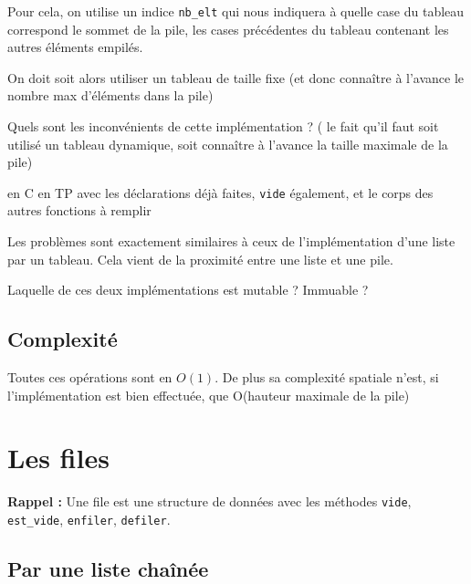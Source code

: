\begin{idee}
	Pour cela, on utilise un indice \texttt{nb\_elt} qui nous indiquera à quelle case du tableau correspond le sommet de la pile, les cases précédentes du tableau contenant les autres éléments empilés.
\end{idee}


\begin{impl}
	On doit soit alors utiliser un tableau de taille fixe (et donc connaître à l'avance le nombre max d'éléments dans la pile)
\end{impl}


\begin{exercise}
	Quels sont les inconvénients de cette implémentation ? ( le fait qu'il faut soit utilisé un tableau dynamique, soit connaître à l'avance la taille maximale de la pile)
\end{exercise}

\begin{impl}
	en C en TP avec les déclarations déjà faites, \texttt{vide} également, et le corps des autres fonctions à remplir
\end{impl}


\begin{rem}
	Les problèmes sont exactement similaires à ceux de l'implémentation d'une liste par un tableau. Cela vient de la proximité entre une liste et une pile.
\end{rem}

\begin{exercise}
	Laquelle de ces deux implémentations est mutable ? Immuable ?
\end{exercise}

\subsection{Complexité}

Toutes ces opérations sont en $O(1)$. De plus sa complexité spatiale n'est, si l'implémentation est bien effectuée, que O(hauteur maximale de la pile)

\section{Les files}

\textbf{Rappel :} Une file est une structure de données avec les méthodes \texttt{vide}, \texttt{est\_vide}, \texttt{enfiler}, \texttt{defiler}.

\subsection{Par une liste chaînée}

